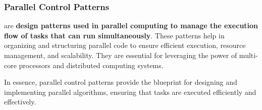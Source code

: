 \subsubsection{Parallel Control Patterns}

 are \textbf{design patterns used in parallel computing to manage the execution flow of tasks that can run simultaneously}. These patterns help in organizing and structuring parallel code to ensure efficient execution, resource management, and scalability. They are essential for leveraging the power of multi-core processors and distributed computing systems.

\highspace
In essence, parallel control patterns provide the blueprint for designing and implementing parallel algorithms, ensuring that tasks are executed efficiently and effectively.

